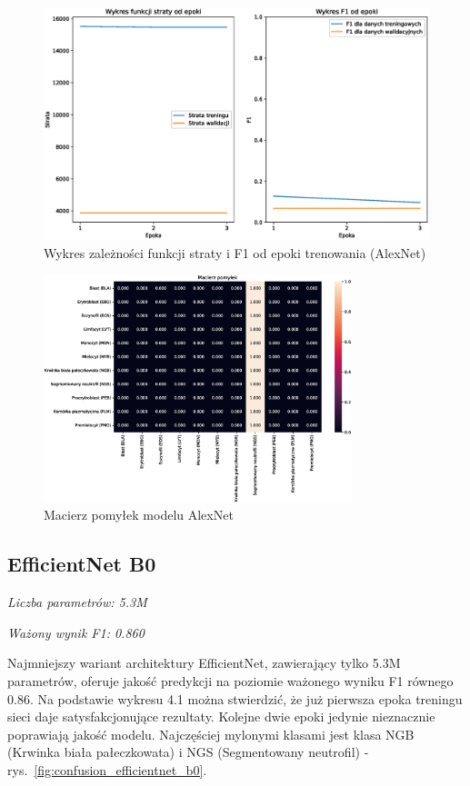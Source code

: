 \begin{figure}
    \centering
    \includegraphics[width=\textwidth]{experiments/alexnet/combined}
    \caption{Wykres zależności funkcji straty i F1 od epoki trenowania (AlexNet)}
    \label{fig:plot_alexnet}
\end{figure}
\begin{figure}
    \centering
    \includegraphics[width=0.8\textwidth]{experiments/alexnet/confusion_matrix}
    \caption{Macierz pomyłek modelu AlexNet}
    \label{fig:confusion_alexnet}
\end{figure}

\subsection{EfficientNet B0}
\textit{Liczba parametrów: 5.3M}

\textit{Ważony wynik F1: 0.860}

Najmniejszy wariant architektury EfficientNet, zawierający tylko 5.3M parametrów, oferuje jakość predykcji na poziomie ważonego wyniku F1 równego 0.86.
Na podstawie wykresu 4.1 można stwierdzić, że już pierwsza epoka treningu sieci daje satysfakcjonujące rezultaty.
Kolejne dwie epoki jedynie nieznacznie poprawiają jakość modelu.
Najczęściej mylonymi klasami jest klasa NGB (Krwinka biała pałeczkowata) i NGS (Segmentowany neutrofil) - rys.~\ref{fig:confusion_efficientnet_b0}.

